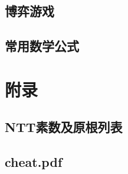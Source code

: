 \documentclass[a4paper]{ctexart}
\begin{document}


\subsection{博弈游戏}

\subsection{常用数学公式}


\section{附录}
\subsection{NTT素数及原根列表}

\subsection{cheat.pdf}

\end{document}
